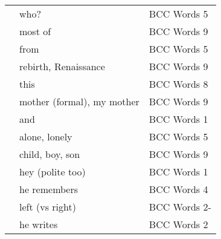 \documentclass[10pt,twocolumn]{article}
\begin{document}
\begin{xtabular*}{\linewidth}{p{0.1\textwidth}p{0.2\textwidth}>{\footnotesize}p{0.2\textwidth}}
 & who? & BCC Words 5 \\
 & most of & BCC Words 9 \\
 & from & BCC Words 5 \\
 & rebirth, Renaissance & BCC Words 9 \\
 & this & BCC Words 8 \\
 & mother (formal), my mother & BCC Words 9 \\
 & and & BCC Words 1 \\
 & alone, lonely & BCC Words 5 \\
 & child, boy, son & BCC Words 9 \\
 & hey (polite too) & BCC Words 1 \\
 & he remembers & BCC Words 4 \\
 & left (vs right) & BCC Words 2- \\
 & he writes & BCC Words 2 \\
\end{xtabular*}
\end{document}
